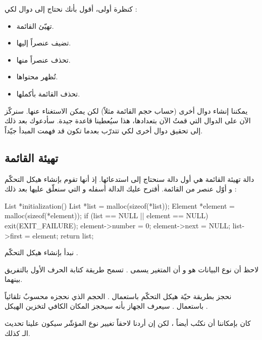 كنظرة أولى، أقول بأنك نحتاج إلى دوال لكي :

\begin{itemize}
	\item تهيّئ القائمة.
	\item تضيف عنصراً إليها.
	\item تحذف عنصراً منها.
	\item تُظهر محتواها.
	\item تحذف القائمة بأكملها.
\end{itemize}

يمكننا إنشاء دوال أخرى (حساب حجم القائمة مثلاً) لكن يمكن الاستغناء عنها. سنركّز الآن على الدوال التي قمتُ الآن بتعدادها، هذا سيُعطينا قاعدة جيدة. سأدعوك بعد ذلك إلى تحقيق دوال أخرى لكي تتدرّب بعدما تكون قد فهمت المبدأ جيّداً.

\subsection{تهيئة القائمة}

دالة تهيئة القائمة هي أول دالة سنحتاج إلى استدعائها. إذ أنها تقوم بإنشاء هيكل التحكّم و أوّل عنصر من القائمة. أقترح عليك الدالة أسفله و التي سنعلّق عليها بعد ذلك :

\begin{Csource}
List *initialization()
{
	List *list = malloc(sizeof(*list));
	Element *element = malloc(sizeof(*element));
	if (list == NULL || element == NULL)
	{
		exit(EXIT_FAILURE);
	}
	element->number = 0;
	element->next = NULL;
	list->first = element;
	return list;
}
\end{Csource}

نبدأ بإنشاء هيكل التحكّم 
.

\begin{information}
لاحظ أن نوع البيانات هو
و أن المتغير يسمى
.
تسمح طريقة كتابة الحرف الأول بالتفريق بينهما.
\end{information}

نحجز بطريقة حيّة هيكل التحكّم باستعمال 
.
الحجم الذي نحجزه محسوبٌ تلقائياً باستعمال
.
سيعرف الجهاز بأنه سيحجز المكان الكافي لتخزين الهيكل
.

\begin{information}
 كان بإمكاننا أن نكتُب أيضاً
،
لكن إن أردنا لاحقاً تغيير نوع المؤشّر
سيكون علينا تحديث الـ
كذلك.
\end{information}

